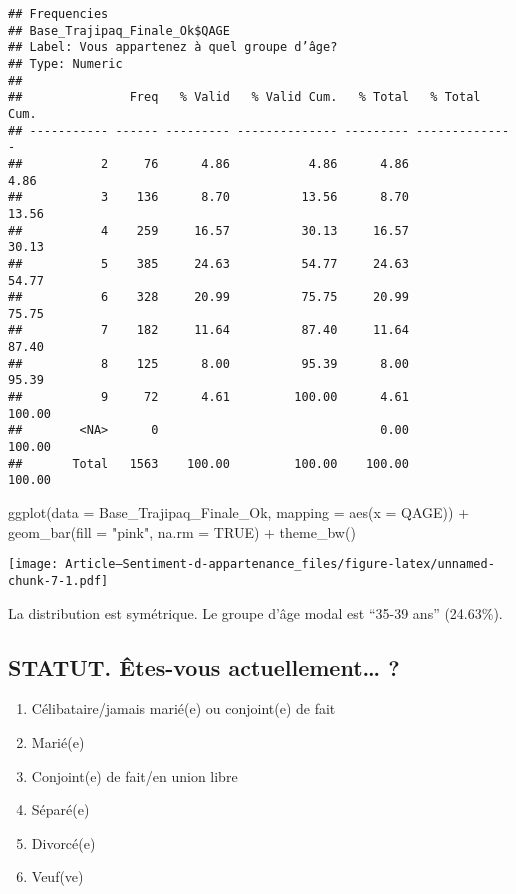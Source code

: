 \documentclass[
]{article}
\newenvironment{Shaded}{\begin{snugshade}}{\end{snugshade}}
\newcommand{\AttributeTok}[1]{\textcolor[rgb]{0.77,0.63,0.00}{#1}}
\newcommand{\ConstantTok}[1]{\textcolor[rgb]{0.00,0.00,0.00}{#1}}
\newcommand{\FunctionTok}[1]{\textcolor[rgb]{0.00,0.00,0.00}{#1}}
\newcommand{\NormalTok}[1]{#1}
\newcommand{\SpecialCharTok}[1]{\textcolor[rgb]{0.00,0.00,0.00}{#1}}
\newcommand{\StringTok}[1]{\textcolor[rgb]{0.31,0.60,0.02}{#1}}
\providecommand{\tightlist}{%
  \setlength{\itemsep}{0pt}\setlength{\parskip}{0pt}}
\begin{document}
\begin{verbatim}
## Frequencies  
## Base_Trajipaq_Finale_Ok$QAGE  
## Label: Vous appartenez à quel groupe d’âge?  
## Type: Numeric  
## 
##               Freq   % Valid   % Valid Cum.   % Total   % Total Cum.
## ----------- ------ --------- -------------- --------- --------------
##           2     76      4.86           4.86      4.86           4.86
##           3    136      8.70          13.56      8.70          13.56
##           4    259     16.57          30.13     16.57          30.13
##           5    385     24.63          54.77     24.63          54.77
##           6    328     20.99          75.75     20.99          75.75
##           7    182     11.64          87.40     11.64          87.40
##           8    125      8.00          95.39      8.00          95.39
##           9     72      4.61         100.00      4.61         100.00
##        <NA>      0                               0.00         100.00
##       Total   1563    100.00         100.00    100.00         100.00
\end{verbatim}

\begin{Shaded}
\begin{Highlighting}[]
\FunctionTok{ggplot}\NormalTok{(}\AttributeTok{data =}\NormalTok{ Base\_Trajipaq\_Finale\_Ok, }\AttributeTok{mapping =} \FunctionTok{aes}\NormalTok{(}\AttributeTok{x =}\NormalTok{ QAGE)) }\SpecialCharTok{+}
  \FunctionTok{geom\_bar}\NormalTok{(}\AttributeTok{fill =} \StringTok{"pink"}\NormalTok{, }\AttributeTok{na.rm =} \ConstantTok{TRUE}\NormalTok{) }\SpecialCharTok{+}
  \FunctionTok{theme\_bw}\NormalTok{()}
\end{Highlighting}
\end{Shaded}

\texttt{[image: Article---Sentiment-d-appartenance\_files/figure-latex/unnamed-chunk-7-1.pdf]}

La distribution est symétrique. Le groupe d'âge modal est ``35-39 ans''
(24.63\%).

\hypertarget{statut.-uxeates-vous-actuellement}{%
\subsection{STATUT. Êtes-vous actuellement\ldots{}
?}\label{statut.-uxeates-vous-actuellement}}

\begin{enumerate}
\def\labelenumi{\arabic{enumi}.}
\tightlist
\item
  Célibataire/jamais marié(e) ou conjoint(e) de fait
\item
  Marié(e)
\item
  Conjoint(e) de fait/en union libre
\item
  Séparé(e)
\item
  Divorcé(e)
\item
  Veuf(ve)
\end{enumerate}
\end{document}
